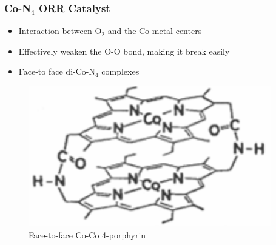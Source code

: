 \documentclass{beamer}
\begin{document}
\begin{frame}
\frametitle{Co-N$_4$ ORR Catalyst}
\begin{itemize}
\item{Interaction between O$_2$ and the Co metal centers}
\item{Effectively weaken the O-O bond, making it break easily}
\newline
\item{Face-to face di-Co-N$_4$ complexes}
\end{itemize}

\begin{figure}[htbp]
    \begin{center}
    \includegraphics[scale=1]{image3}
    \caption{Face-to-face Co-Co 4-porphyrin}
    \end{center}
\end{figure}
\end{frame}
\end{document}
